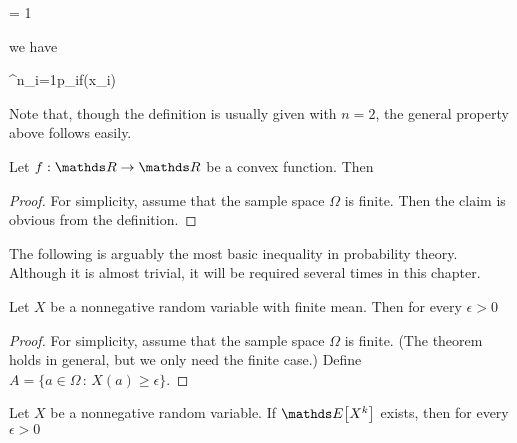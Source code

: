 \documentclass[scombinatorics.tex]{subfiles}
\begin{document}
{=}
{1}

we have

{\le}
{\sum^n_{i=1}p_if(x_i)}\smallskip

Note that, though the definition is usually given with $n=2$, the general property above follows easily.

\begin{void_thm}\label{Jensen}
Let $f:\RR\to\RR$ be a convex function.
  Then

  {\le}
  {\Ex\Big[f(X)\Big]}
\end{void_thm}


\begin{proof}
  For simplicity, assume that the sample space $\Omega$ is finite.
  Then the claim is obvious from the definition.
\end{proof}

The following is arguably the most basic inequality in probability theory.
Although it is almost trivial, it will be required several times in this chapter. 

\begin{void_thm}\label{Markov}
  Let $X$ be a nonnegative random variable with finite mean.
  Then for every $\epsilon>0$

  {\le}
  {\frac{\Ex[X]}{\epsilon}}
\end{void_thm}

\begin{proof}
  For simplicity, assume that the sample space $\Omega$ is finite.
  (The theorem holds in general, but we only need the finite case.)
  Define $A=\{a\in\Omega\,:\, X(a)\ge\epsilon\}$.





\end{proof}

\begin{corollary}
  Let $X$ be a nonnegative random variable.
  If $\Ex\big[X^k\big]$ exists, then for every $\epsilon>0$
  
  {\le}
  {}
\end{corollary}
\end{document}
